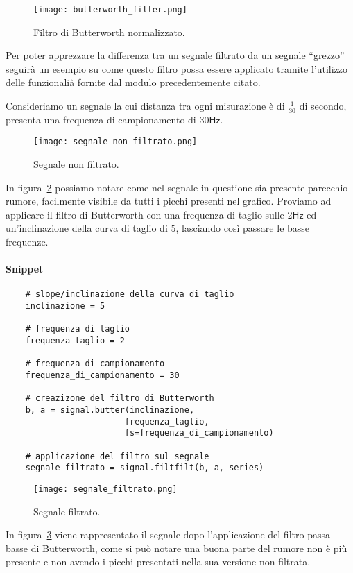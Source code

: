 \begin{figure}[H]
    \centering
    \texttt{[image: butterworth\_filter.png]}
    \caption{Filtro di Butterworth normalizzato.}
    \label{fig:butterworth_filter}
\end{figure}

Per poter apprezzare la differenza tra un segnale filtrato da un segnale ``grezzo''
seguirà un esempio su come questo filtro possa essere applicato tramite l'utilizzo
delle funzionalià fornite dal modulo precedentemente citato.

\begin{esempio} 
Consideriamo un segnale la cui distanza tra ogni misurazione è di $\frac{1}{30}$
di secondo, presenta una frequenza di campionamento di $30\mathsf{Hz}$.

\begin{figure}[H]
    \centering
    \texttt{[image: segnale\_non\_filtrato.png]}
    \caption{Segnale non filtrato.}
    \label{fig:segnale_non_filtrato}
\end{figure}

In figura~\ref*{fig:segnale_non_filtrato} possiamo notare come nel segnale
in questione sia presente parecchio rumore, facilmente visibile da tutti i picchi 
presenti nel grafico. Proviamo ad applicare il filtro di Butterworth con una frequenza
di taglio sulle $2\mathsf{Hz}$ ed un'inclinazione della curva di taglio di $5$, lasciando
così passare le basse frequenze.


\paragraph{Snippet}
\begin{verbatim}
    # slope/inclinazione della curva di taglio
    inclinazione = 5 

    # frequenza di taglio
    frequenza_taglio = 2

    # frequenza di campionamento
    frequenza_di_campionamento = 30

    # creazizone del filtro di Butterworth
    b, a = signal.butter(inclinazione, 
                        frequenza_taglio, 
                        fs=frequenza_di_campionamento)

    # applicazione del filtro sul segnale
    segnale_filtrato = signal.filtfilt(b, a, series)
\end{verbatim}

\begin{figure}[H]
    \centering
    \texttt{[image: segnale\_filtrato.png]}
    \caption{Segnale filtrato.}
    \label{fig:segnale_filtrato}
\end{figure}

In figura~\ref*{fig:segnale_filtrato} viene rappresentato il segnale dopo l'applicazione
del filtro passa basse di Butterworth, come si può notare una buona parte del rumore
non è più presente e non avendo i picchi presentati nella sua versione non filtrata.

\end{esempio}



